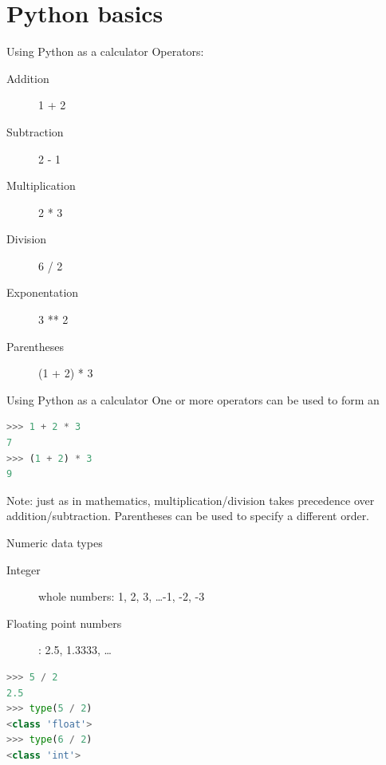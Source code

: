 \documentclass[aspectratio=169,usenames,dvipsnames]{beamer}
\begin{document}
\section{Python basics}
\frame{\tableofcontents[currentsection]}

\begin{frame}[fragile]{Using Python as a calculator}
Operators:
    \begin{description}
        \item[Addition] 1 + 2
        \item[Subtraction] 2 - 1
        \item[Multiplication] 2 * 3
        \item[Division] 6 / 2
        \item[Exponentation] 3 ** 2
        \item[Parentheses] (1 + 2) * 3
    \end{description}
\end{frame}

\begin{frame}[fragile]{Using Python as a calculator}
One or more operators can be used to form an 
\begin{lstlisting}[language=python]
>>> 1 + 2 * 3
7
>>> (1 + 2) * 3
9
\end{lstlisting}

\pause
Note: just as in mathematics, multiplication/division takes precedence over
    addition/subtraction. Parentheses can be used to specify a different order.
\end{frame}

\begin{frame}[fragile]{Numeric data types}
    \begin{description}
        \item[Integer] whole numbers: 1, 2, 3, \dots -1, -2, -3
        \item[Floating point numbers]: 2.5, 1.3333, \dots
    \end{description}

\pause
\begin{lstlisting}[language=python]
>>> 5 / 2
2.5
>>> type(5 / 2)
<class 'float'>
>>> type(6 / 2)
<class 'int'>
\end{lstlisting}
\end{frame}
\end{document}
